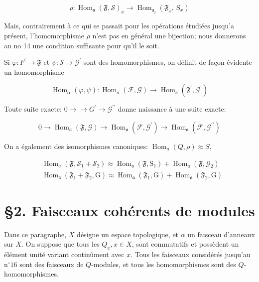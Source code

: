 $$
\rho: \operatorname{Hom}_{\mathfrak{a}}(\mathfrak{F}, \mathcal{S})_{x} \rightarrow \operatorname{Hom}_{\mathfrak{a _ { z }}}\left(\mathfrak{F}_{x}, \mathrm{~S}_{x}\right)
$$

Mais, contrairement à ce qui se passait pour les opérations étudiées jusqu'a présent, l'homomorphisme $\rho$ n'est pas en général une bijection; nous donnerons au no 14 une condition suffisante pour qu'il le soit.

Si $\varphi: F^{\prime} \rightarrow \mathfrak{F}$ et $\psi: \mathcal{S} \rightarrow \mathcal{G}^{\prime}$ sont des homomorphismes, on définit de façon évidente un homomorphisme

$$
\operatorname{Hom}_{\alpha}(\varphi, \psi): \operatorname{Hom}_{a}(\mathcal{F}, \mathcal{G}) \rightarrow \operatorname{Hom}_{\mathfrak{a}}\left(\mathfrak{F}^{\prime}, \mathcal{G}^{\prime}\right)
$$

Toute suite exacte: $0 \rightarrow \mathcal{\rightarrow} G^{\prime} \rightarrow \mathcal{G}^{\prime \prime}$ donne naissance à une suite exacte:

$$
0 \rightarrow \operatorname{Hom}_{a}(\mathfrak{F}, \mathcal{G}) \rightarrow \operatorname{Hom}_{\mathfrak{a}}\left(\mathscr{F}, \mathcal{G}^{\prime}\right) \rightarrow \operatorname{Hom}_{\mathfrak{a}}\left(\mathcal{F}, \mathcal{G}^{\prime \prime}\right)
$$

On a également des isomorphismes canoniques: $\operatorname{Hom}_{a}(Q, \rho) \approx S$,

$$
\begin{aligned}
    &\operatorname{Hom}_{a}\left(\mathfrak{F}, \mathcal{S}_{1}+\mathcal{S}_{2}\right) \approx \operatorname{Hom}_{\mathfrak{a}}\left(\mathfrak{F}, \mathrm{S}_{1}\right)+\operatorname{Hom}_{\mathfrak{a}}\left(\mathfrak{F}, \mathcal{G}_{2}\right) \\
    &\operatorname{Hom}_{\mathfrak{a}}\left(\mathfrak{F}_{1}+\mathfrak{F}_{2}, \mathrm{G}\right) \approx \operatorname{Hom}_{\mathfrak{a}}\left(\mathfrak{F}_{1}, \mathrm{G}\right)+\operatorname{Hom}_{\mathfrak{a}}\left(\mathfrak{F}_{2}, \mathrm{G}\right)
\end{aligned}
$$

\section{§2. Faisceaux cohérents de modules}

Dans ce paragraphe, $X$ désigne un espace topologique, et $\alpha$ un faisceau d'anneaux sur $X$. On suppose que tous les $Q_{x}, x \in X$, sont commutatifs et possèdent un élément unité variant continûment avec $x .$ Tous les faisceaux considérés jusqu'au $\mathrm{n}^{\circ} 16$ sont des faisceaux de $Q$-modules, et tous les homomorphismes sont des $Q$-homomorphismes.


